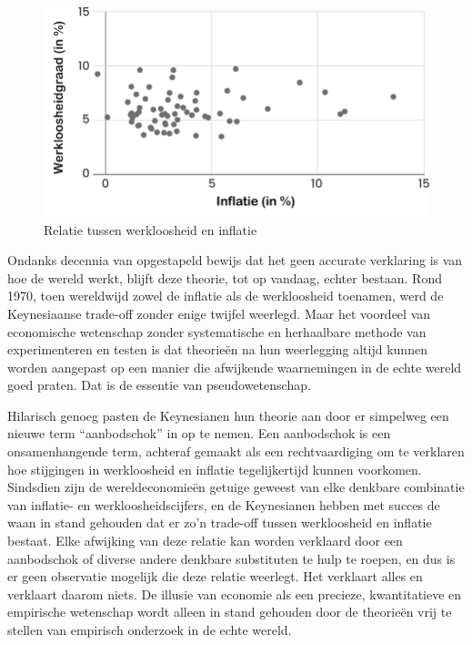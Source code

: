 \begin{figure}[!htb]
\centering
    \includegraphics[width=\textwidth]{figures/fig1-1.png}
\caption[Relatie tussen werkloosheid en inflatie]{Relatie tussen werkloosheid en inflatie\footnotemark}
\label{fig1}
\end{figure}


Ondanks decennia van opgestapeld bewijs dat het geen accurate verklaring is van hoe de wereld werkt, blijft deze theorie, tot op vandaag, echter bestaan. Rond 1970, toen wereldwijd zowel de inflatie als de werkloosheid toenamen, werd de Keynesiaanse trade-off zonder enige twijfel weerlegd. Maar het voordeel van economische wetenschap zonder systematische en herhaalbare methode van experimenteren en testen is dat theorieën na hun weerlegging altijd kunnen worden aangepast op een manier die afwijkende waarnemingen in de echte wereld goed praten. Dat is de essentie van pseudowetenschap.

Hilarisch genoeg pasten de Keynesianen hun theorie aan door er simpelweg een nieuwe term ``aanbodschok'' in op te nemen. Een aanbodschok is een onsamenhangende term, achteraf gemaakt als een rechtvaardiging om te verklaren hoe stijgingen in werkloosheid en inflatie tegelijkertijd kunnen voorkomen. Sindsdien zijn de wereldeconomieën getuige geweest van elke denkbare combinatie van inflatie- en werkloosheidscijfers, en de Keynesianen hebben met succes de waan in stand gehouden dat er zo’n trade-off tussen werkloosheid en inflatie bestaat. Elke afwijking van deze relatie kan worden verklaard door een aanbodschok of diverse andere denkbare substituten te hulp te roepen, en dus is er geen observatie mogelijk die deze relatie weerlegt. Het verklaart alles en verklaart daarom niets. De illusie van economie als een precieze, kwantitatieve en empirische wetenschap wordt alleen in stand gehouden door de theorieën vrij te stellen van empirisch onderzoek in de echte wereld.

